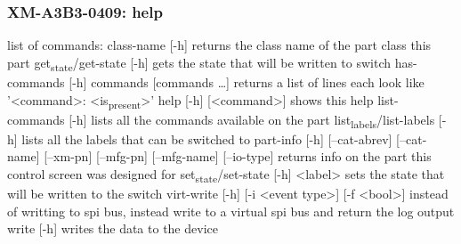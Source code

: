 \documentclass[11pt]{article}
\begin{document}
\subsubsection{XM-A3B3-0409: help}
\label{sec:org99cbabf}
list of commands:
  class-name [-h]
    returns the class name of the part class this part
  get\textsubscript{state}/get-state [-h]
    gets the state that will be written to switch
  has-commands [-h] commands [commands \ldots{}]
    returns a list of lines each look like '<command>: <is\textsubscript{present}>'
  help [-h] [<command>]
    shows this help
  list-commands [-h]
    lists all the commands available on the part
  list\textsubscript{labels}/list-labels [-h]
    lists all the labels that can be switched to
  part-info  [-h] [--cat-abrev] [--cat-name] [--xm-pn] [--mfg-pn] [--mfg-name]
          [--io-type]
    returns info on the part this control screen was designed for
  set\textsubscript{state}/set-state [-h] <label>
    sets the state that will be written to the switch
  virt-write [-h] [-i <event type>] [-f <bool>]
    instead of writting to spi bus, instead write to a virtual spi bus
    and return the log output
  write [-h]
    writes the data to the device
\end{document}
